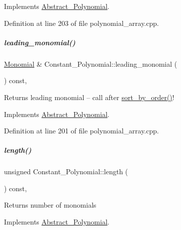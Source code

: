 Implements \hyperlink{group__polygroup_a511ce8e997fe3fd1141293d256e25fad}{Abstract\+\_\+\+Polynomial}.



Definition at line 203 of file polynomial\+\_\+array.\+cpp.

\mbox{\label{group__polygroup_a08a102d5d0f33bc9cc604316e6256788}} 
\subparagraph{\texorpdfstring{leading\+\_\+monomial()}{leading\_monomial()}}
{\footnotesize\ttfamily \hyperlink{group__polygroup_class_monomial}{Monomial} \& Constant\+\_\+\+Polynomial\+::leading\+\_\+monomial (\begin{DoxyParamCaption}{ }\end{DoxyParamCaption}) const\hspace{0.3cm}{\ttfamily [override]}, {\ttfamily [virtual]}}

\begin{DoxyReturn}{Returns}
leading monomial -- call after \hyperlink{group__polygroup_a808018b52eca472a7a1b2995e403f35a}{sort\+\_\+by\+\_\+order()}! 
\end{DoxyReturn}


Implements \hyperlink{group__polygroup_a9186ed0f55c5cc4ecb1b9bc11ba9f679}{Abstract\+\_\+\+Polynomial}.



Definition at line 201 of file polynomial\+\_\+array.\+cpp.

\mbox{\label{group__polygroup_a9a6bcfaf1f4d6260b39f6abfb2b646ea}} 
\subparagraph{\texorpdfstring{length()}{length()}}
{\footnotesize\ttfamily unsigned Constant\+\_\+\+Polynomial\+::length (\begin{DoxyParamCaption}{ }\end{DoxyParamCaption}) const\hspace{0.3cm}{\ttfamily [override]}, {\ttfamily [virtual]}}

\begin{DoxyReturn}{Returns}
number of monomials 
\end{DoxyReturn}


Implements \hyperlink{group__polygroup_a48f4c3c030ca66a9386cd71f71d5def7}{Abstract\+\_\+\+Polynomial}.



